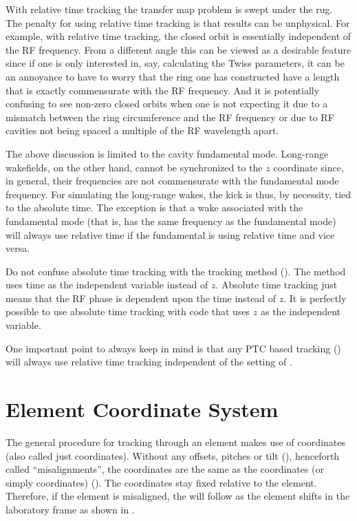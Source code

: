 With relative time tracking the transfer map problem is swept under the rug. The penalty for using
relative time tracking is that results can be unphysical. For example, with relative time tracking,
the closed orbit is essentially independent of the RF frequency. From a different angle this can be
viewed as a desirable feature since if one is only interested in, say, calculating the Twiss
parameters, it can be an annoyance to have to worry that the ring one has constructed have a length
that is exactly commensurate with the RF frequency. And it is potentially confusing to see non-zero
closed orbits when one is not expecting it due to a mismatch between the ring circumference and the
RF frequency or due to RF cavities not being spaced a multiple of the RF wavelength apart.

The above discussion is limited to the cavity fundamental mode. Long-range wakefields, on the
other hand, cannot be synchronized to the $z$ coordinate since, in general, their frequencies are
not commensurate with the fundamental mode frequency. For simulating the long-range wakes, the kick
is thus, by necessity, tied to the absolute time. The exception is that a wake associated with the
fundamental mode (that is, has the same frequency as the fundamental mode) will always use relative
time if the fundamental is using relative time and vice versa.

Do not confuse absolute time tracking with the  tracking method
(). The  method uses time as the independent variable instead of
$z$. Absolute time tracking just means that the RF phase is dependent upon the time instead of
$z$. It is perfectly possible to use absolute time tracking with code that uses $z$ as the
independent variable.

One important point to always keep in mind is that any PTC based tracking () will
always use relative time tracking independent of the setting of .

\section{Element Coordinate System}
\label{s:ele.coords}

The general procedure for tracking through an element makes use of 
coordinates (also called just  coordinates). Without any offsets, pitches or tilt
(), henceforth called ``misalignments'', the  coordinates are the same as
the  coordinates (or simply  coordinates)
(). The  coordinates stay fixed relative to the element. Therefore, if the
element is misaligned, the  will follow as the element shifts in the
laboratory frame as shown in .

